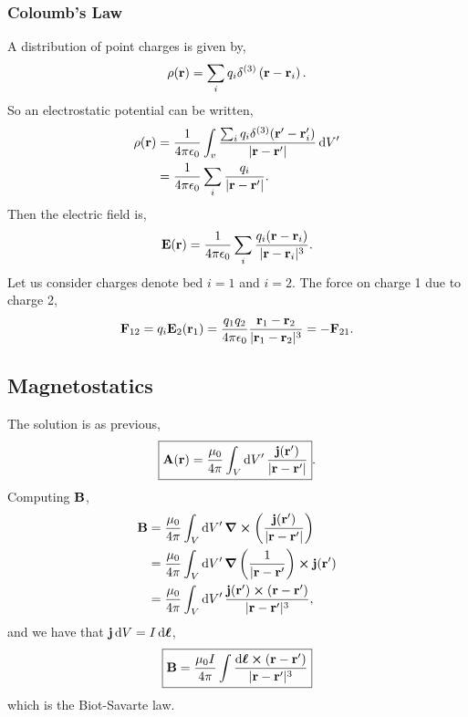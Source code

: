 \documentclass{book}
\begin{document}
\subsubsection{Coloumb's Law}
A distribution of point charges is given by,
\begin{equation}
	\rho(\vb{r}) = \sum_i q_i\delta^{(3)}\left(\vb{r}-\vb{r}_i\right).
\end{equation}
So an electrostatic potential can be written,
\begin{equation}
	\begin{split}
		\rho(\vb{r}) &= \frac{1}{4\pi\epsilon_0}\int_v\dfrac{\sum_iq_i\delta^{(3)}(\vb{r}' - \vb{r}'_i)}{|\vb{r}-\vb{r}'|} \dd{V'} \\
		& = \frac{1}{4\pi\epsilon_0}\sum_i \frac{q_i}{|\vb{r}-\vb{r}'|}.
	\end{split}
\end{equation}
Then the electric field is,
\begin{equation}
	\vb{E}(\vb{r}) = \frac{1}{4\pi\epsilon_0}\sum_i \frac{q_i(\vb{r} -\vb{r}_i)}{|\vb{r}-\vb{r}_i|^3}.
\end{equation}
Let us consider charges denote bed $i=1$ and $i=2$. The force on charge 1 due to charge 2,
\begin{equation}
	\vb{F}_{12} = q_i\vb{E}_2(\vb{r}_1) = \frac{q_1q_2}{4\pi\epsilon_0}\frac{\vb{r}_1 - \vb{r}_2}{|\vb{r}_1 -\vb{r}_2|^3} = -\vb{F}_{21}.
\end{equation}
\subsection{Magnetostatics}
The solution is as previous,
\begin{equation}
	\boxed{\vb{A}(\vb{r}) = \frac{\mu_0}{4\pi}\int_V\dd{V'}\frac{\vb{j}(\vb{r}')}{|\vb{r}-\vb{r}'|}}.
\end{equation}
Computing $\vb{B}$,
\begin{equation}
	\begin{split}
		\vb{B} &= \frac{\mu_0}{4\pi}\int_V\dd{V'}\curl{\left(\frac{\vb{j}(\vb{r}')}{|\vb{r} - \vb{r}'|}\right)} \\
		& = \frac{\mu_0}{4\pi}\int_V\dd{V'} \grad \left(\frac{1}{|\vb{r} - \vb{r}'}\right)\cross \vb{j}(\vb{r}') \\
		& = \frac{\mu_0}{4\pi}\int_V\dd{V'} \frac{\vb{j}(\vb{r}')\cross(\vb{r} - \vb{r}')}{|\vb{r} - \vb{r}'|^3},
	\end{split}
\end{equation}
and we have that $\vb{j} \dd{V} = I \dd{\vb*{\ell}}$,
\begin{equation}
	\boxed{\vb{B} = \frac{\mu_0 I}{4\pi} \int \frac{\dd{\vb*{\ell}}\cross(\vb{r} - \vb{r}')}{|\vb{r} - \vb{r}'|^3}}
\end{equation}
which is the Biot-Savarte law.
\end{document}
